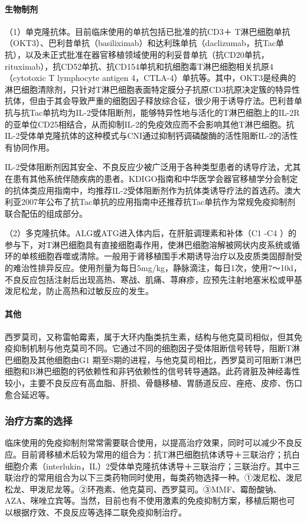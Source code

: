 \paragraph{生物制剂}

（1）单克隆抗体。目前临床使用的单抗包括已批准的抗CD3{＋}
T淋巴细胞单抗（OKT3）、巴利昔单抗（basiliximab）和达利珠单抗（daclizumab，抗Tac单抗），以及未正式批准在器官移植领域使用的利妥昔单抗（抗CD20单抗，rituximab），抗CD52单抗、抗CD154单抗和抗细胞毒T淋巴细胞相关抗原4（cytotoxic
T lymphocyte antigen
4，CTLA-4）单抗等。其中，OKT3是经典的淋巴细胞清除剂，只针对T淋巴细胞表面特定膜分子抗原CD3抗原决定簇的特异性抗体，但由于其会导致严重的细胞因子释放综合征，很少用于诱导疗法。巴利昔单抗与抗Tac单抗均为IL-2受体阻断剂，能够特异性地与活化的T淋巴细胞上的IL-2R的亚单位CD25相结合，从而抑制IL-2的免疫效应而不会影响其他T淋巴细胞。抗IL-2受体单克隆抗体的这种模式与CNI通过抑制钙调磷酸酶的活性阻断IL-2的活性有协同作用。

IL-2受体阻断剂因其安全、不良反应少被广泛用于各种类型患者的诱导疗法，尤其在患有其他系统伴随疾病的患者。KDIGO指南和中华医学会器官移植学分会制定的抗体类应用指南中，均推荐IL-2受体阻断剂作为抗体类诱导疗法的首选药。澳大利亚2007年公布了抗Tac单抗的应用指南中还推荐抗Tac单抗作为常规免疫抑制剂联合配伍的组成部分。

（2）多克隆抗体。ALG或ATG进入体内后，在肝脏调理素和补体（C{1} -C{4}
）的参与下，对T淋巴细胞具有直接细胞毒作用，使淋巴细胞溶解被网状内皮系统或循环的单核细胞吞噬或清除。一般用于肾移植围手术期诱导治疗以及皮质类固醇耐受的难治性排异反应。使用剂量为每日5mg/kg，静脉滴注，每日1次，使用7～10d，不良反应包括注射后出现高热、寒战、肌痛、荨麻疹，应预先注射地塞米松或甲基泼尼松龙，防止高热和过敏反应的发生。
\paragraph{其他}

西罗莫司，又称雷帕霉素，属于大环内酯类抗生素，结构与他克莫司相似，但其免疫抑制机制与他克莫司不同。它通过不同的细胞因子受体阻断信号转导，阻断T淋巴细胞及其他细胞由G{1}
期至S期的进程，与他克莫司相比，西罗莫司可阻断T淋巴细胞和B淋巴细胞的钙依赖性和非钙依赖性的信号转导通路。此药肾脏及神经毒性较小，主要不良反应有高血脂、肝损、骨髓移植、胃肠道反应、痤疮、皮疹、伤口愈合延迟等。

\subsubsection{治疗方案的选择}

临床使用的免疫抑制剂常常需要联合使用，以提高治疗效果，同时可以减少不良反应。目前肾移植术后较为常用的组合为：抗T淋巴细胞抗体诱导＋三联治疗；抗白细胞介素（interlukin，IL）2受体单克隆抗体诱导＋三联治疗；三联治疗。其中三联治疗的常用组合为以下三类药物同时使用，每类药物选择一种。①泼尼松、泼尼松龙、甲泼尼龙等。②环孢素、他克莫司、西罗莫司。③MMF、霉酚酸钠、AZA、咪唑立宾等。当然，目前也有不使用激素的免疫抑制方案，移植后期也可以根据疗效、不良反应等选择二联免疫抑制治疗。
